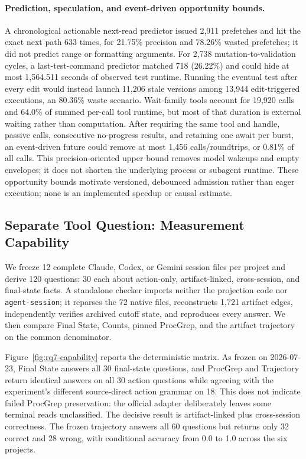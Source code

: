 \documentclass[letterpaper]{article}
\newcommand{\artifact}[1]{\texttt{#1}}
\begin{document}
\paragraph{Prediction, speculation, and event-driven opportunity bounds.}
A chronological actionable next-read predictor issued 2,911 prefetches and hit
the exact next path 633 times, for 21.75\% precision and 78.26\% wasted
prefetches; it did not predict range or formatting arguments.  For 2,738
mutation-to-validation cycles, a last-test-command predictor matched 718
(26.22\%) and could hide at most 1,564.511 seconds of observed test runtime.
Running the eventual test after every edit would instead launch 11,206 stale
versions among 13,944 edit-triggered executions, an 80.36\% waste scenario.
Wait-family tools account for 19,920 calls and 64.0\% of summed per-call tool
runtime, but most of that duration is external waiting rather than computation.
After requiring the same tool and handle, passive calls, consecutive
no-progress results, and retaining one await per burst, an event-driven future
could remove at most 1,456 calls/roundtrips, or 0.81\% of all calls.  This
precision-oriented upper bound removes model wakeups and empty envelopes; it
does not shorten the underlying process or subagent runtime.  These opportunity
bounds motivate versioned, debounced admission rather than eager execution;
none is an implemented speedup or causal estimate.

\subsection{Separate Tool Question: Measurement Capability}

We freeze 12 complete Claude, Codex, or Gemini session files per project and
derive 120 questions: 30 each about action-only, artifact-linked,
cross-session, and final-state facts.  A standalone checker imports neither
the projection code nor \artifact{agent-session}; it reparses the 72 native
files, reconstructs 1,721 artifact edges, independently verifies archived
cutoff state, and reproduces every answer.  We then compare Final State,
Counts, pinned ProcGrep, and the artifact trajectory on the common denominator.

Figure~\ref{fig:rq7-capability} reports the deterministic matrix.  As frozen
on 2026-07-23, Final State answers all 30 final-state questions, and ProcGrep
and Trajectory return identical answers on all 30 action questions while
agreeing with the experiment's different source-direct action grammar on 18.
This does not indicate failed ProcGrep preservation: the official adapter
deliberately leaves some terminal reads unclassified.  The decisive result is
artifact-linked plus cross-session correctness.  The frozen trajectory answers
all 60 questions but returns only 32 correct and 28 wrong, with conditional
accuracy from 0.0 to 1.0 across the six projects.
\end{document}
